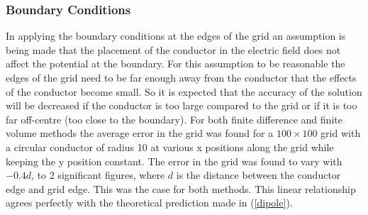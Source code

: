 \documentclass[aps,twocolumn,pre,nofootinbib,10pt]{revtex4-1}
\begin{document}
\subsubsection{Boundary Conditions}

In applying the boundary conditions at the edges of the grid an assumption is being made that the placement of the conductor in the electric field does not affect the potential at the boundary. For this assumption to be reasonable the edges of the grid need to be far enough away from the conductor that the effects of the conductor become small. So it is expected that the accuracy of the solution will be decreased if the conductor is too large compared to the grid or if it is too far off-centre (too close to the boundary). For both finite difference and finite volume methods the average error in the grid was found for a $100 \times 100$ grid with a circular conductor of radius 10 at various x positions along the grid while keeping the y position constant. The error in the grid was found to vary with \(-0.4d\), to 2 significant figures, where $d$ is the distance between the conductor edge and grid edge. This was the case for both methods. This linear relationship agrees perfectly with the theoretical 
prediction made in (\ref{dipole}).
\end{document}
